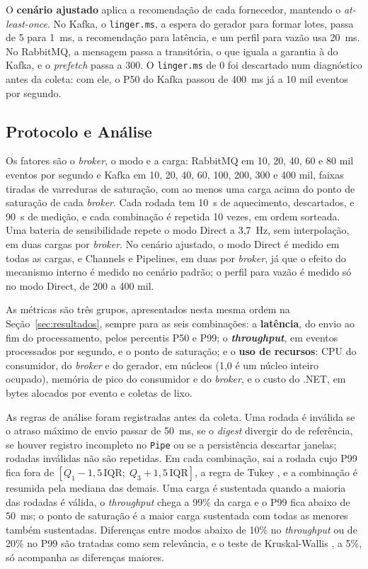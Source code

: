 \documentclass[12pt]{article}
\begin{document}
O \textbf{cenário ajustado} aplica a recomendação de cada fornecedor, mantendo o
\textit{at-least-once}. No Kafka, o \texttt{linger.ms}, a espera do gerador para formar
lotes, passa de 5 para 1~ms, a recomendação para latência, e um perfil para vazão usa
20~ms. No RabbitMQ, a mensagem passa a transitória, o que iguala a garantia à do Kafka, e o
\textit{prefetch} passa a 300. O \texttt{linger.ms} de 0 foi descartado num diagnóstico
antes da coleta: com ele, o P50 do Kafka passou de 400~ms já a 10 mil eventos por segundo.

\subsection{Protocolo e Análise}
\label{sec:analise}

Os fatores são o \textit{broker}, o modo e a carga: RabbitMQ em 10, 20, 40, 60 e 80 mil eventos
por segundo e Kafka em 10, 20, 40, 60, 100, 200, 300 e 400 mil, faixas tiradas de
varreduras de saturação, com ao menos uma carga acima do ponto de saturação de cada
\textit{broker}. Cada rodada tem 10~s de aquecimento, descartados, e 90~s de medição, e cada
combinação é repetida 10 vezes, em ordem sorteada. Uma bateria de sensibilidade repete o
modo Direct a 3,7~Hz, sem interpolação, em duas cargas por \textit{broker}. No cenário ajustado,
o modo Direct é medido em todas as cargas, e Channels e Pipelines, em duas por \textit{broker},
já que o efeito do mecanismo interno é medido no cenário padrão; o perfil para vazão é
medido só no modo Direct, de 200 a 400 mil.

As métricas são três grupos, apresentados nesta mesma ordem na
Seção~\ref{sec:resultados}, sempre para as seis combinações: a \textbf{latência}, do envio
ao fim do processamento, pelos percentis P50 e P99; o \textbf{\textit{throughput}}, em eventos
processados por segundo, e o ponto de saturação; e o \textbf{uso de recursos}: CPU do
consumidor, do \textit{broker} e do gerador, em núcleos (1,0 é um núcleo inteiro ocupado), memória
de pico do consumidor e do \textit{broker}, e o custo do .NET, em bytes alocados por evento e
coletas de lixo.

As regras de análise foram registradas antes da coleta. Uma rodada é inválida se o atraso
máximo de envio passar de 50~ms, se o \textit{digest} divergir do de referência, se houver registro
incompleto no \texttt{Pipe} ou se a persistência descartar janelas; rodadas inválidas não
são repetidas. Em cada combinação, sai a rodada cujo P99 fica fora de
$[Q_1 - 1{,}5\,\mathrm{IQR};\; Q_3 + 1{,}5\,\mathrm{IQR}]$, a regra de Tukey
\cite{tukey:1977}, e a combinação é resumida pela mediana das demais. Uma carga é
sustentada quando a maioria das rodadas é válida, o \textit{throughput} chega a 99\% da carga e o
P99 fica abaixo de 50~ms; o ponto de saturação é a maior carga sustentada com todas as
menores também sustentadas. Diferenças entre modos abaixo de 10\% no \textit{throughput} ou de 20\%
no P99 são tratadas como sem relevância, e o teste de Kruskal-Wallis
\cite{kruskal:1952}, a 5\%, só acompanha as diferenças maiores.
\end{document}
